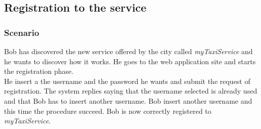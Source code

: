\subsection{Registration to the service}
\subsubsection{Scenario}
Bob has discovered the new service offered by the city called \textit{myTaxiService} and he wants to discover how it works. He goes to the web application site and starts the registration phase.\\
He insert a the username and the password he wants and submit the request of registration. The system replies saying that the username selected is already used and that Bob has to insert another username. Bob insert another username and this time the procedure succeed. Bob is now correctly registered to \textit{myTaxiService}.
\pagebreak
